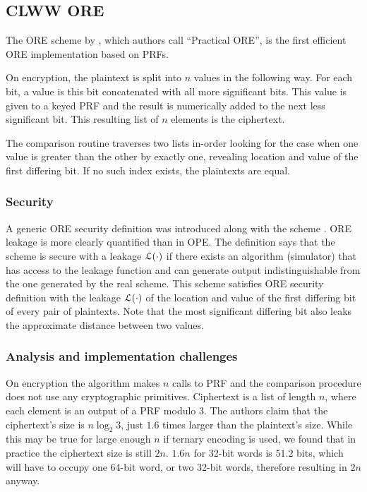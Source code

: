 \subsection{CLWW ORE}\label{section:range-snapshot:clww}

	The ORE scheme by \textcite{clww-ore}, which authors call ``Practical ORE'', is the first efficient ORE implementation based on PRFs.

	On encryption, the plaintext is split into $n$ values in the following way.
	For each bit, a value is this bit concatenated with all more significant bits.
	This value is given to a keyed PRF and the result is numerically added to the next less significant bit.
	This resulting list of $n$ elements is the ciphertext.

	The comparison routine traverses two lists in-order looking for the case when one value is greater than the other by exactly one, revealing location and value of the first differing bit.
	If no such index exists, the plaintexts are equal.

	\subsubsection{Security}
		A generic ORE security definition was introduced along with the scheme \cite{clww-ore}.
		ORE leakage is more clearly quantified than in OPE\@.
		The definition says that the scheme is secure with a leakage $\mathcal{L}(\cdot)$ if there exists an algorithm (simulator) that has access to the leakage function and can generate output indistinguishable from the one generated by the real scheme.
		This scheme satisfies ORE security definition with the leakage $\mathcal{L}(\cdot)$ of the location and value of the first differing bit of every pair of plaintexts.
		Note that the most significant differing bit also leaks the approximate distance between two values.

	\subsubsection{Analysis and implementation challenges}

		On encryption the algorithm makes $n$ calls to PRF and the comparison procedure does not use any cryptographic primitives.
		Ciphertext is a list of length $n$, where each element is an output of a PRF modulo 3.
		The authors claim that the ciphertext's size is $n \log_2 3$, just $1.6$ times larger than the plaintext's size.
		While this may be true for large enough $n$ if ternary encoding is used, we found that in practice the ciphertext size is still $2n$.
		$1.6 n$ for 32-bit words is $51.2$ bits, which will have to occupy one 64-bit word, or two 32-bit words, therefore resulting in $2n$ anyway.
